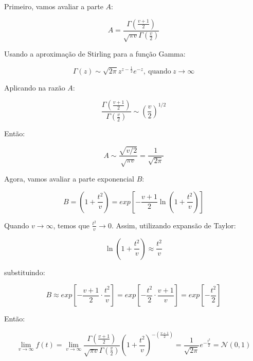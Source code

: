 \documentclass{article}
\begin{document}
Primeiro, vamos avaliar a parte $A$:

\begin{equation*}
    A = \frac{\Gamma \left(\frac{v + 1}{2}\right)}{\sqrt{\pi v}\Gamma\left(\frac{v}{2}\right)}
\end{equation*}

Usando a aproximação de Stirling para a função Gamma:

\begin{equation*}
    \Gamma(z) \sim \sqrt{2\pi}z^{z - \frac{1}{2}}e^{-z}, \ \text{quando} \ z \rightarrow \infty
\end{equation*}

Aplicando na razão $A$:

\begin{equation*}
    \frac{\Gamma\left(\frac{v + 1}{2}\right)}{\Gamma \left(\frac{v}{2}\right)} \sim \left(\frac{v}{2}\right)^{1/2}
\end{equation*}

Então:

\begin{equation*}
    A \sim \frac{\sqrt{v/2}}{\sqrt{\pi v}} = \frac{1}{\sqrt{2\pi}}
\end{equation*}

Agora, vamos avaliar a parte exponencial $B$:

\begin{equation*}
    B = \left(1 + \frac{t^2}{v}\right) = exp\left[-\frac{v + 1}{2}\ln \left(1 + \frac{t^2}{v}\right)\right]
\end{equation*}

Quando $v \rightarrow \infty$, temos que $\frac{t^2}{v} \rightarrow 0$. Assim, utilizando expansão de Taylor:

\begin{equation*}
    \ln\left(1 + \frac{t^2}{v}\right) \approx \frac{t^2}{v}
\end{equation*}

substituindo:

\begin{equation*}
    B \approx exp \left[- \frac{v + 1}{2} \cdot \frac{t^2}{v}\right] = exp \left[- \frac{t^2}{2} \cdot \frac{v + 1}{v}\right] = exp \left[-\frac{t^2}{2}\right]
\end{equation*} 

Então:

\begin{equation*}
    \lim_{v \rightarrow \infty} f(t) = \lim_{v \rightarrow \infty} \frac{\Gamma\left(\frac{v + 1}{2}\right)}{\sqrt{\pi v}\Gamma\left(\frac{v}{2}\right)}\left(1 + \frac{t^2}{v}\right)^{-\left(\frac{v + 1}{2}\right)} = \frac{1}{\sqrt{2\pi}}e^{-\frac{t^2}{2}} = \mathcal{N}(0, 1)
\end{equation*}
\end{document}
